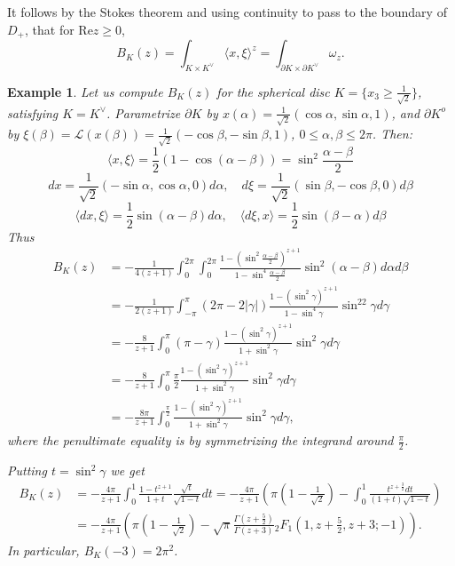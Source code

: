 \documentclass[reqno,10pt]{amsart}
\newcounter{mp}
\renewcommand{\Re}{\mathrm {Re}}
\newtheorem{exmp}{Example}[section]
\begin{document}
\endproof

It follows by the Stokes theorem and using continuity to pass to the boundary of $D_+$, that for $\Re z\geq 0$,
\begin{equation}\label{eq:stokes_beta}B_K(z) = \int_{ K\times K^\vee} \langle x,\xi\rangle^z = \int_{\partial K\times \partial K^\vee} \omega_z. \end{equation}

\begin{exmp}  Let us compute $B_K(z)$ for the spherical disc $K=\{x_3\geq \frac{1}{\sqrt 2}\}$, satisfying $K=K^\vee$. 
Parametrize $\partial K$ by $x(\alpha)=\frac{1}{\sqrt 2}(\cos \alpha, \sin\alpha, 1)$, and $\partial K^o$ by $\xi(\beta)=\mathcal L(x(\beta))=\frac{1}{\sqrt 2}(-\cos \beta, -\sin\beta, 1)$, $0\leq \alpha,\beta\leq 2\pi$.
Then: \[\langle x,\xi\rangle =\frac12(1-\cos(\alpha-\beta))=\sin^2\frac{\alpha-\beta}{2}\]
\[ dx=\frac{1}{\sqrt 2}(-\sin\alpha,\cos\alpha,0)d\alpha,\quad  d\xi=\frac{1}{\sqrt 2}(\sin\beta,-\cos\beta,0)d\beta \]
\[\langle dx,\xi\rangle = \frac12\sin(\alpha-\beta)d\alpha,\quad \langle d\xi,x\rangle =\frac12\sin(\beta-\alpha)d\beta  \]
Thus
\begin{align*} B_K(z)&=-\frac{1}{4(z+1)} \int_0^{2\pi}\int_0^{2\pi}\frac{1-(\sin^2\frac{\alpha-\beta}{2})^{z+1}}{1-\sin^4\frac{\alpha-\beta}{2}}\sin^2(\alpha-\beta)d\alpha d\beta 
\\& =-\frac{1}{2(z+1)}\int_{-\pi}^{\pi}(2\pi-2|\gamma|)\frac{1-(\sin^2\gamma)^{z+1}}{1-\sin^4\gamma}\sin^22\gamma d\gamma\\&=
-\frac{8}{z+1}\int_0^{\pi}(\pi-\gamma)\frac{1-(\sin^2\gamma)^{z+1}}{1+\sin^2\gamma}\sin^2\gamma d\gamma\\&=
-\frac{8}{z+1}\int_0^{\pi}\frac \pi 2\frac{1-(\sin^2\gamma)^{z+1}}{1+\sin^2\gamma}\sin^2\gamma d\gamma
\\&=
-\frac{8\pi}{z+1}\int_0^{\frac\pi2}\frac{1-(\sin^2\gamma)^{z+1}}{1+\sin^2\gamma}\sin^2\gamma d\gamma, \end{align*}
where the penultimate equality is by symmetrizing the integrand around $\frac\pi 2$. 

Putting $t=\sin^2\gamma$ we get
\begin{align*} B_K(z)&=-\frac{4\pi}{z+1}\int_0^1\frac{1-t^{z+1}}{1+t}\frac{\sqrt t}{\sqrt{1-t}}dt=-\frac{4\pi}{z+1}(\pi(1-\frac{1}{\sqrt 2})-\int_0^1 \frac{t^{z+\frac 32}dt}{(1+t)\sqrt{1-t}} ) 
\\&=-\frac{4\pi}{z+1}\left(\pi(1-\frac{1}{\sqrt 2})-\sqrt\pi \frac{\Gamma(z+\frac 52)}{\Gamma(z+3)}{}_2F_1(1,z+\frac52,z+3;-1)\right) 
.\end{align*}
In particular, $B_K(-3)=2\pi^2$.
\end{exmp}
\end{document}
